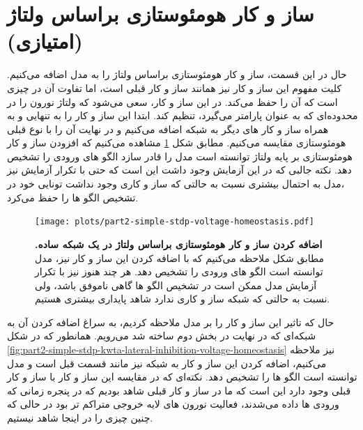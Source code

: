 \clearpage
\section{ساز و کار هومئوستازی براساس ولتاژ (امتیازی)}
        حال در این قسمت، ساز و کار هومئوستازی براساس ولتاژ را به مدل اضافه می‌کنیم. کلیت مفهوم این ساز و کار نیز همانند ساز و کار قبلی است، اما تفاوت آن در چیزی است که آن را حفظ می‌کند. در این ساز و کار، سعی می‌شود که ولتاژ نورون را در محدوده‌ای که به عنوان پارامتر می‌گیرد، تنظیم کند. ابتدا این ساز و کار را به تنهایی و به همراه ساز و کار های دیگر به شبکه اضافه می‌کنیم و در نهایت آن را با نوع قبلی هومئوستازی مقایسه می‌کنیم. مطابق شکل 
        \ref{fig:part2-simple-stdp-voltage-homeostasis} 
        مشاهده می‌کنیم که افزودن ساز و کار هومئوستازی بر پایه ولتاژ توانسته است مدل را قادر سازد الگو های ورودی را تشخیص دهد. نکته جالبی که در این آزمایش وجود داشت این است که حتی با تکرار آزمایش نیز ،مدل به احتمال بیشتری نسبت به حالتی که ساز و کاری وجود نداشت تونایی خود در تشخیص الگو ها را حفظ می‌کرد.

        \begin{figure}[!ht]
            \centering
            \texttt{[image: plots/part2-simple-stdp-voltage-homeostasis.pdf]} 
            \captionsetup{width=.9\linewidth}
            \caption{\textbf{ اضافه کردن ساز و کار
            هومئوستازی براساس ولتاژ در یک شبکه ساده.} مطابق شکل ملاحظه می‌کنیم که با اضافه کردن این ساز و کار نیز، مدل توانسته است الگو های ورودی را تشخیص دهد. هر چند هنوز نیز با تکرار آزمایش مدل ممکن است در تشخیص الگو ها گاهی ناموفق باشد، ولی نسبت به حالتی که شبکه ساز و کاری ندارد شاهد پایداری بیشتری هستیم.}
            \label{fig:part2-simple-stdp-voltage-homeostasis}
        \end{figure}

        حال که تاثیر این ساز و کار را بر مدل ملاحظه کردیم، به سراغ اضافه کردن آن به شبکه‌ای که در نهایت در بخش دوم ساخته شد می‌رویم. همانطور که در شکل 
        \ref{fig:part2-simple-stdp-kwta-lateral-inhibition-voltage-homeostasis} 
        نیز ملاحظه می‌کنیم، اضافه کردن این ساز و کار به شبکه نیز مانند قسمت قبل است و مدل توانسته است الگو ها را تشخیص دهد. نکته‌ای که در مقایسه این ساز و کار با ساز و کار قبلی وجود دارد این است که ما در ساز و کار قبلی شاهد بودیم که در پنجره زمانی که ورودی ها داده می‌شدند، فعالیت نورون های لایه خروجی متراکم تر بود در حالی که چنین چیزی را در اینجا شاهد نیستیم.

